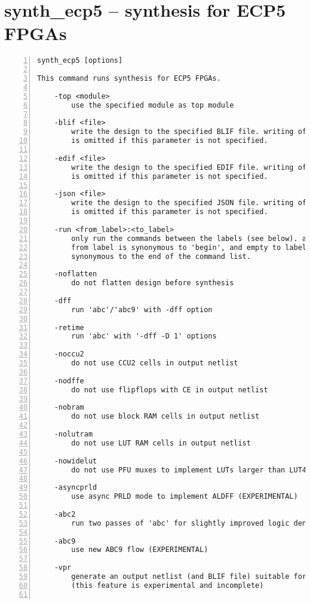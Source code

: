 \section{synth\_ecp5 -- synthesis for ECP5 FPGAs}
\label{cmd:synth_ecp5}
\begin{lstlisting}[numbers=left,frame=single]
    synth_ecp5 [options]

This command runs synthesis for ECP5 FPGAs.

    -top <module>
        use the specified module as top module

    -blif <file>
        write the design to the specified BLIF file. writing of an output file
        is omitted if this parameter is not specified.

    -edif <file>
        write the design to the specified EDIF file. writing of an output file
        is omitted if this parameter is not specified.

    -json <file>
        write the design to the specified JSON file. writing of an output file
        is omitted if this parameter is not specified.

    -run <from_label>:<to_label>
        only run the commands between the labels (see below). an empty
        from label is synonymous to 'begin', and empty to label is
        synonymous to the end of the command list.

    -noflatten
        do not flatten design before synthesis

    -dff
        run 'abc'/'abc9' with -dff option

    -retime
        run 'abc' with '-dff -D 1' options

    -noccu2
        do not use CCU2 cells in output netlist

    -nodffe
        do not use flipflops with CE in output netlist

    -nobram
        do not use block RAM cells in output netlist

    -nolutram
        do not use LUT RAM cells in output netlist

    -nowidelut
        do not use PFU muxes to implement LUTs larger than LUT4s

    -asyncprld
        use async PRLD mode to implement ALDFF (EXPERIMENTAL)

    -abc2
        run two passes of 'abc' for slightly improved logic density

    -abc9
        use new ABC9 flow (EXPERIMENTAL)

    -vpr
        generate an output netlist (and BLIF file) suitable for VPR
        (this feature is experimental and incomplete)


\end{lstlisting}
